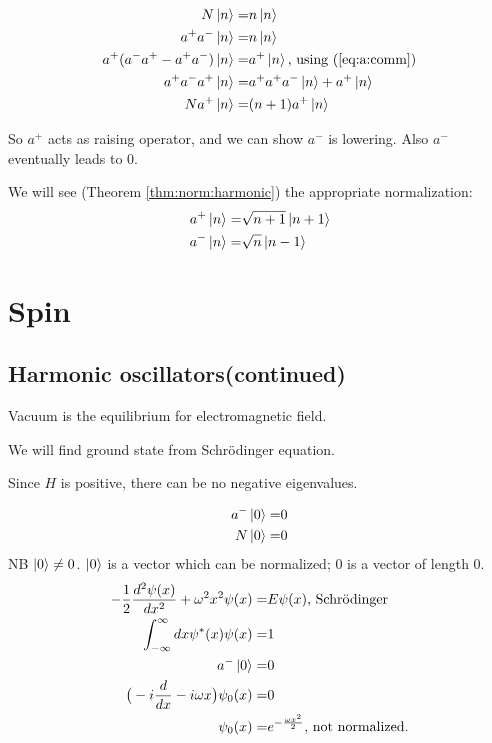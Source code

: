 \documentclass[]{article}
\begin{document}
\begin{align*}
	N\ket{n} =& n\ket{n}\\
	a^+a^-\ket{n} =& n\ket{n}\\
	a^+(a^-a^+ - a^+a^-)\ket{n} =& a^+\ket{n}\text{, using (\ref{eq:a:comm})}\\
	a^+a^-a^+ \ket{n} =& a^+a^+a^-\ket{n} + a^+\ket{n}\\
	N a^+ \ket{n} =& (n+1) a^+ \ket{n}
\end{align*}

So $a^+$ acts as raising operator, and we can show $a^-$ is lowering. Also $a^-$ eventually leads to $0$.

We will see (Theorem \ref{thm:norm:harmonic}) the appropriate normalization:
\begin{align*}
	a^+\ket{n} =& \sqrt{n+1}\ket{n+1}\\
	a^-\ket{n} =& \sqrt{n}\ket{n-1}
\end{align*}
 
\section{Spin}

\subsection{Harmonic oscillators(continued)}
Vacuum is the equilibrium for electromagnetic field. 

We will find ground state from Schr\"odinger equation.

Since $H$ is positive, there can be no negative eigenvalues.

\begin{align*}
	a^-\ket{0}=&0\\
	N\ket{0}=& 0
\end{align*}
NB $\ket{0} \ne 0$. $\ket{0}$ is a vector which can be normalized; $0$ is a vector of length 0.
\begin{align*}
	-\frac{1}{2}\frac{d^2 \psi(x)}{dx^2} + \omega^2 x^2 \psi(x)=& E\psi(x)\text{, Schr\"odinger}\\
	\int_{-\infty}^{\infty} dx \psi^*(x) \psi(x) =& 1\\
	a^-\ket{0}=& 0\\
	\big(-i \frac{d}{dx} - i \omega x \big)\psi_0(x) =& 0\\
	\psi_0(x) =& e^{-\frac{\omega x^2}{2}} \text{, not normalized.}
\end{align*}
\end{document}
